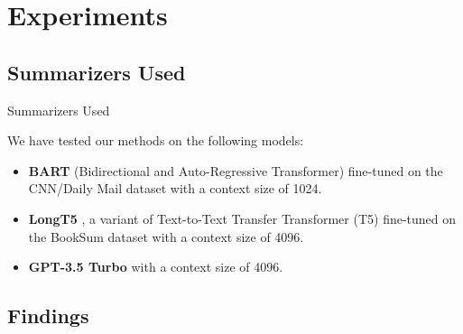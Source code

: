\section{Experiments}


	\subsection{Summarizers Used}

		\begin{frame}{Summarizers Used}

			We have tested our methods on the following models:

			\begin{itemize}
				\item \textbf{BART} (Bidirectional and Auto-Regressive Transformer)
				\citep{lewis-etal-2020-bart} fine-tuned on the CNN/Daily Mail dataset
				with a context size of 1024.
				\item \textbf{LongT5} \citep{guo2021longt5}, a variant of Text-to-Text
				Transfer Transformer (T5) \citep{raffel2020exploring} fine-tuned on the
				BookSum dataset with a context size of 4096.
				\item \textbf{GPT-3.5 Turbo} \citep{brown2020language} with a context
				size of 4096.
			\end{itemize}

		\end{frame}


	\subsection{Findings}

